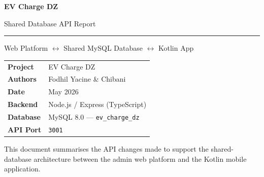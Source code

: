 \documentclass[12pt,a4paper]{report}
\begin{document}

\begin{titlepage}
  \centering
  \vspace*{2.5cm}

  {\fontsize{42}{50}\selectfont\bfseries\color{brandblue} EV Charge DZ}

  \vspace{0.5cm}
  {\LARGE Shared Database API Report}

  \vspace{0.3cm}
  \textcolor{midblue}{\rule{0.6\linewidth}{1pt}}

  \vspace{0.5cm}
  {\large\color{labelgray} Web Platform $\boldsymbol{\leftrightarrow}$ Shared MySQL Database $\boldsymbol{\leftrightarrow}$ Kotlin App}

  \vspace{2cm}

  \begin{tcolorbox}[
    colback  = lightblue,
    colframe = midblue,
    arc      = 6pt,
    width    = 0.75\linewidth,
    halign   = center,
  ]
    \begin{tabular}{ll}
      \textbf{\color{brandblue}Project}   & EV Charge DZ \\[3pt]
      \textbf{\color{brandblue}Authors}   & Fodhil Yacine \& Chibani \\[3pt]
      \textbf{\color{brandblue}Date}      & May 2026 \\[3pt]
      \textbf{\color{brandblue}Backend}   & Node.js / Express (TypeScript) \\[3pt]
      \textbf{\color{brandblue}Database}  & MySQL 8.0 — \texttt{ev\_charge\_dz} \\[3pt]
      \textbf{\color{brandblue}API Port}  & \texttt{3001} \\
    \end{tabular}
  \end{tcolorbox}

  \vfill
  {\small\color{labelgray} This document summarises the API changes made to support
  the shared-database architecture between the admin web platform and the Kotlin
  mobile application.}
\end{titlepage}

\tableofcontents
\clearpage
{}

\end{document}
